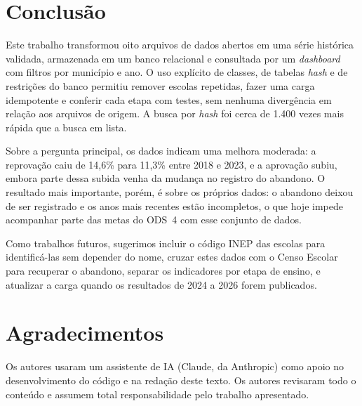 \documentclass[preprint,10pt,5p]{elsarticle}
\begin{document}

\section{Conclusão}
\label{conclusion}

Este trabalho transformou oito arquivos de dados abertos em uma série histórica validada, armazenada em um banco relacional e consultada por um \textit{dashboard} com filtros por município e ano. O uso explícito de classes, de tabelas \textit{hash} e de restrições do banco permitiu remover escolas repetidas, fazer uma carga idempotente e conferir cada etapa com testes, sem nenhuma divergência em relação aos arquivos de origem. A busca por \textit{hash} foi cerca de 1.400 vezes mais rápida que a busca em lista.

Sobre a pergunta principal, os dados indicam uma melhora moderada: a reprovação caiu de 14,6\% para 11,3\% entre 2018 e 2023, e a aprovação subiu, embora parte dessa subida venha da mudança no registro do abandono. O resultado mais importante, porém, é sobre os próprios dados: o abandono deixou de ser registrado e os anos mais recentes estão incompletos, o que hoje impede acompanhar parte das metas do ODS~4 com esse conjunto de dados.

Como trabalhos futuros, sugerimos incluir o código INEP das escolas para identificá-las sem depender do nome, cruzar estes dados com o Censo Escolar para recuperar o abandono, separar os indicadores por etapa de ensino, e atualizar a carga quando os resultados de 2024 a 2026 forem publicados.



\section*{Agradecimentos}
Os autores usaram um assistente de IA (Claude, da Anthropic) como apoio no desenvolvimento do código e na redação deste texto. Os autores revisaram todo o conteúdo e assumem total responsabilidade pelo trabalho apresentado.




\end{document}
